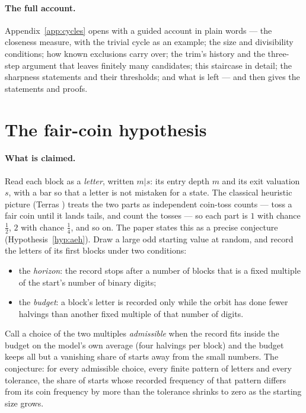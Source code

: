 \documentclass[11pt]{article}
\theoremstyle{remark}
\begin{document}
\paragraph{The full account.} Appendix~\ref{app:cycles} opens with a guided account in plain words --- the closeness measure, with the trivial cycle as an example; the size and divisibility conditions; how known exclusions carry over; the trim's history and the three-step argument that leaves finitely many candidates; this staircase in detail; the sharpness statements and their thresholds; and what is left --- and then gives the statements and proofs.

\section{The fair-coin hypothesis}\label{sec:aeh}

\paragraph{What is claimed.} Read each block as a \emph{letter}, written $m|s$: its entry depth $m$ and its exit valuation $s$, with a bar so that a letter is not mistaken for a state. The classical heuristic picture (Terras \cite{terras}) treats the two parts as independent coin-toss counts --- toss a fair coin until it lands tails, and count the tosses --- so each part is $1$ with chance $\tfrac12$, $2$ with chance $\tfrac14$, and so on. The paper states this as a precise conjecture (Hypothesis~\ref{hyp:aeh}). Draw a large odd starting value at random, and record the letters of its first blocks under two conditions:
\begin{itemize}
\item the \emph{horizon}: the record stops after a number of blocks that is a fixed multiple of the start's number of binary digits;
\item the \emph{budget}: a block's letter is recorded only while the orbit has done fewer halvings than another fixed multiple of that number of digits.
\end{itemize}
Call a choice of the two multiples \emph{admissible} when the record fits inside the budget on the model's own average (four halvings per block) and the budget keeps all but a vanishing share of starts away from the small numbers. The conjecture: for every admissible choice, every finite pattern of letters and every tolerance, the share of starts whose recorded frequency of that pattern differs from its coin frequency by more than the tolerance shrinks to zero as the starting size grows.
\end{document}
